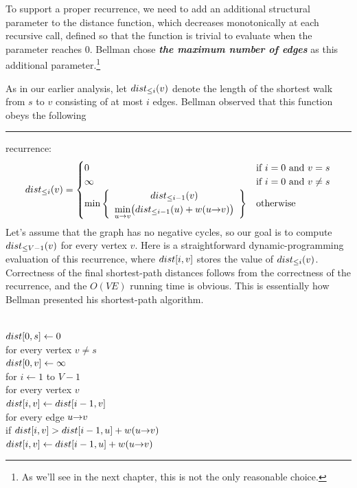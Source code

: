 To support a proper recurrence, we need to add an additional structural parameter to the distance function, which decreases monotonically at each recursive call, defined so that the function is trivial to evaluate when the parameter reaches $0$.
Bellman chose \textbf{\textit{the maximum number of edges}} as this additional parameter.\footnote{As we’ll see in the next chapter, this is not the only reasonable choice.}

As in our earlier analysis, let $dist_{\le i}(v)$ denote the length of the shortest walk from $s$ to $v$ consisting of at most $i$ edges.
Bellman observed that this function obeys the following \settowidth{\dimen0}{Bellman’s equation}\rule[0.45ex]{}{0.4pt} recurrence:
\[
dist_{\le i}(v) = \begin{cases}
0 & \text{if } i = 0 \text{ and } v = s\\
\infty & \text{if } i = 0 \text{ and } v \neq s\\
\min\left\{\begin{array}{c} dist_{\le i-1}(v)\\ \displaystyle\min_{u\mathord{\rightarrow}v} \bigl(dist_{\le i-1}(u) + w(u\mathord{\rightarrow}v)\bigr) \end{array}\right\} & \text{otherwise}
\end{cases}
\]
Let’s assume that the graph has no negative cycles, so our goal is to compute $dist_{\le V-1}(v)$ for every vertex $v$.
Here is a straightforward dynamic-programming evaluation of this recurrence, where $dist[i, v]$ stores the value of $dist_{\le i}(v)$.
Correctness of the final shortest-path distances follows from the correctness of the recurrence, and the $O(VE)$ running time is obvious.
This is essentially how Bellman presented his shortest-path algorithm.

\begin{pseudocode}
\\
$dist[0, s] \gets 0$\\
for every vertex $v \neq s$\\
\Indent $dist[0, v] \gets \infty$\\
for $i \gets 1$ to $V - 1$\\
\Indent for every vertex $v$\\
\Indent\Indent $dist[i, v] \gets dist[i - 1, v]$\\
\Indent\Indent for every edge $u\mathord{\rightarrow}v$\\
\Indent\Indent\Indent if $dist[i, v] > dist[i - 1, u] + w(u\mathord{\rightarrow}v)$\\
\Indent\Indent\Indent\Indent $dist[i, v] \gets dist[i - 1, u] + w(u\mathord{\rightarrow}v)$
\end{pseudocode}

